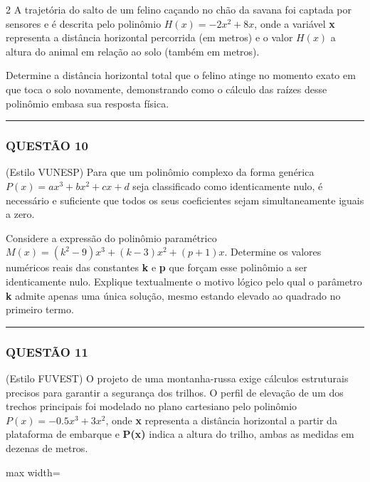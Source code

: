 \documentclass[11pt, a4paper]{article}
\begin{document}
\begin{multicols*}{2}
A trajetória do salto de um felino caçando no chão da savana foi captada por sensores e é descrita pelo polinômio $ H(x) = -2x^2 + 8x $, onde a variável \textbf{x} representa a distância horizontal percorrida (em metros) e o valor $ H(x) $ a altura do animal em relação ao solo (também em metros). 

Determine a distância horizontal total que o felino atinge no momento exato em que toca o solo novamente, demonstrando como o cálculo das raízes desse polinômio embasa sua resposta física.

\vspace{0cm} \noindent\textcolor{CorLinha}{\rule{\linewidth}{0.5pt}} \vspace{-0.2cm}
\subsubsection*{QUESTÃO 10}

(Estilo VUNESP) Para que um polinômio complexo da forma genérica $ P(x) = ax^3 + bx^2 + cx + d $ seja classificado como identicamente nulo, é necessário e suficiente que todos os seus coeficientes sejam simultaneamente iguais a zero.

Considere a expressão do polinômio paramétrico $ M(x) = (k^2 - 9)x^3 + (k - 3)x^2 + (p + 1)x $. 
Determine os valores numéricos reais das constantes \textbf{k} e \textbf{p} que forçam esse polinômio a ser identicamente nulo. Explique textualmente o motivo lógico pelo qual o parâmetro \textbf{k} admite apenas uma única solução, mesmo estando elevado ao quadrado no primeiro termo.

\vspace{0cm} \noindent\textcolor{CorLinha}{\rule{\linewidth}{0.5pt}} \vspace{-0.2cm}
\subsubsection*{QUESTÃO 11}

(Estilo FUVEST) O projeto de uma montanha-russa exige cálculos estruturais precisos para garantir a segurança dos trilhos. O perfil de elevação de um dos trechos principais foi modelado no plano cartesiano pelo polinômio $ P(x) = -0.5x^3 + 3x^2 $, onde \textbf{x} representa a distância horizontal a partir da plataforma de embarque e \textbf{P(x)} indica a altura do trilho, ambas as medidas em dezenas de metros.

\begin{center}
\begin{adjustbox}{max width=\linewidth}
\end{adjustbox}
\end{center}
\end{multicols*}
\end{document}
